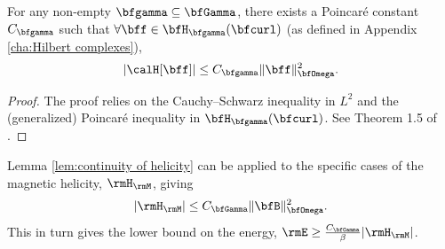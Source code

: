     \line

    \begin{lemma}\label{lem:continuity of helicity}
        For any non-empty $\bfgamma  \subseteq  \bfGamma$, there exists a Poincaré constant $C_{\bfgamma}$ such that $\forall  \bff  \in  \bfH_{\bfgamma}(\bfcurl)$ (as defined in Appendix \ref{cha:Hilbert complexes}),
        \begin{equation}
            |\calH[\bff]|  \leq  C_{\bfgamma}\|\bff\|_{\bfOmega}^{2}.
        \end{equation}
    \end{lemma}
    \begin{proof}
        The proof relies on the Cauchy--Schwarz inequality in $L^{2}$ and the (generalized) Poincaré inequality in $\bfH_{\bfgamma}(\bfcurl)$. See Theorem 1.5 of \cite{Arnold_Khesin_2008}. 
    \end{proof}

    \begin{corollary}
        Lemma \ref{lem:continuity of helicity} can be applied to the specific cases of the magnetic helicity, $\rmH_{\rmM}$, giving
        \begin{equation}
            |\rmH_{\rmM}|  \leq  C_{\bfGamma}\|\bfB\|_{\bfOmega}^{2}.
        \end{equation}
        This in turn gives the lower bound on the energy, $\rmE  \geq  \frac{C_{\bfGamma}}{\beta}|\rmH_{\rmM}|$.
    \end{corollary}


    \line
